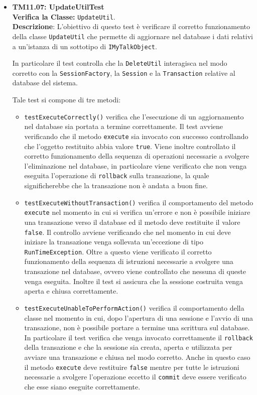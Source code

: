 \begin{itemize}
\item[\passed] \textbf{TM11.07: UpdateUtilTest}\\
\textbf{Verifica la Classe:} \texttt{UpdateUtil}.\\
\textbf{Descrizione}: L'obiettivo di questo test è verificare il corretto funzionamento della classe \texttt{UpdateUtil} che permette di aggiornare nel database i dati relativi a un'istanza di un sottotipo di \texttt{IMyTalkObject}.

In particolare il test controlla che la \texttt{DeleteUtil} interagisca nel modo corretto con la \texttt{SessionFactory}, la \texttt{Session} e la \texttt{Transaction} relative al database del sistema.

Tale test si compone di tre metodi:
\begin{itemize}
\item \texttt{testExecuteCorrectly()} verifica che l'esecuzione di un aggiornamento nel database sia portata a termine correttamente. Il test avviene verificando che il metodo \texttt{execute} sia invocato con successo controllando che l'oggetto restituito abbia valore \texttt{true}. Viene inoltre controllato il corretto funzionamento della sequenza di operazioni necessarie a svolgere l'eliminazione nel database, in particolare viene verificato che non venga eseguita l'operazione di \texttt{rollback} sulla transazione, la quale significherebbe che la transazione non è andata a buon fine.

\item \texttt{testExecuteWithoutTransaction()}  verifica il comportamento del metodo \\ \texttt{execute} nel momento in cui si verifica un'errore e non è possibile iniziare una transazione verso il database ed il metodo deve restituite il valore \texttt{false}. Il controllo avviene verificando che nel momento in cui deve iniziare la transazione venga sollevata un'eccezione di tipo \texttt{RunTimeException}. Oltre a questo viene verificato il corretto funzionamento della sequenza di istruzioni necessarie a svolgere una transazione nel database, ovvero viene controllato che nessuna di queste venga eseguita. Inoltre il test si assicura che la sessione costruita venga aperta e chiusa correttamente.

\item \texttt{testExecuteUnableToPerformAction()} verifica il comportamento della classe nel momento in cui, dopo l'apertura di una sessione e l'avvio di una transazione, non è possibile portare a termine una scrittura sul database. In particolare il test verifica che venga invocato correttamente il \texttt{rollback} della transazione e che la sessione sia creata, aperta e utilizzata per avviare una transazione e chiusa nel modo corretto. Anche in questo caso il metodo \texttt{execute} deve restituire \texttt{false} mentre per tutte le istruzioni necessarie a svolgere l'operazione eccetto il \texttt{commit} deve essere verificato che esse siano eseguite correttamente.


\end{itemize}
\end{itemize}
